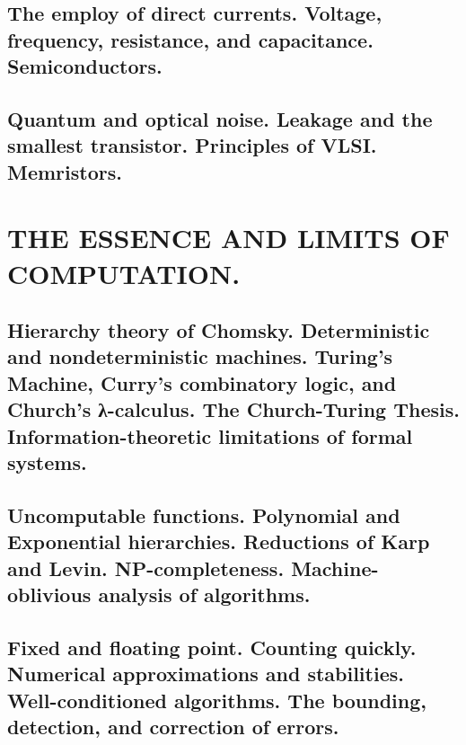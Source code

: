 \documentclass[letterpaper,draft]{memoir}
\begin{document}
\chapter{The employ of direct currents. Voltage, frequency, resistance, and capacitance. Semiconductors.}

\chapter{Quantum and optical noise. Leakage and the smallest transistor. Principles
of VLSI. Memristors.}

\part{THE ESSENCE AND LIMITS OF COMPUTATION.}


\chapter{Hierarchy theory of Chomsky. Deterministic and nondeterministic machines.
Turing's Machine, Curry's combinatory logic, and Church's \greektext λ\latintext-calculus. The
Church-Turing Thesis. Information-theoretic limitations of formal systems.}

\chapter{Uncomputable functions. Polynomial and Exponential hierarchies. Reductions
of Karp and Levin. NP-completeness. Machine-oblivious analysis of algorithms.}

\chapter{Fixed and floating point. Counting quickly. Numerical approximations and
stabilities. Well-conditioned algorithms. The bounding, detection, and
correction of errors.}
\end{document}
